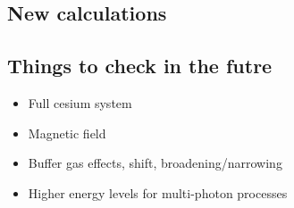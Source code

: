 \documentclass{article}
\begin{document}
\begin{spacing}{1.1}
\section{New calculations}


\subsection{Things to check in the futre}
\begin{itemize}
\item Full cesium system
\item Magnetic field
\item Buffer gas effects, shift, broadening/narrowing
\item Higher energy levels for multi-photon processes
\end{itemize}

\newpage
{}



\end{spacing}
\end{document}
